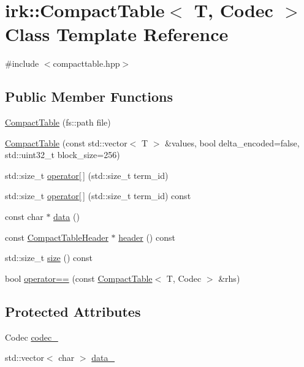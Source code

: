 \hypertarget{classirk_1_1CompactTable}{}\section{irk\+:\+:Compact\+Table$<$ T, Codec $>$ Class Template Reference}
\label{classirk_1_1CompactTable}


{\ttfamily \#include $<$compacttable.\+hpp$>$}

\subsection*{Public Member Functions}
\begin{DoxyCompactItemize}
\item 
\mbox{\hyperlink{classirk_1_1CompactTable_ae43cef6f30a5f83f0fbdbfec98adcc31}{Compact\+Table}} (fs\+::path file)
\item 
\mbox{\hyperlink{classirk_1_1CompactTable_a8dad958871c16f0d615d6dafcbcc2284}{Compact\+Table}} (const std\+::vector$<$ T $>$ \&values, bool delta\+\_\+encoded=false, std\+::uint32\+\_\+t block\+\_\+size=256)
\item 
std\+::size\+\_\+t \mbox{\hyperlink{classirk_1_1CompactTable_ac38c5d57aa8e8f26f844952d0ac3b392}{operator\mbox{[}$\,$\mbox{]}}} (std\+::size\+\_\+t term\+\_\+id)
\item 
std\+::size\+\_\+t \mbox{\hyperlink{classirk_1_1CompactTable_afc3597fe319993be64bdaabc53863c9b}{operator\mbox{[}$\,$\mbox{]}}} (std\+::size\+\_\+t term\+\_\+id) const
\item 
const char $\ast$ \mbox{\hyperlink{classirk_1_1CompactTable_a03d76b3db79f79d4c218e1eeeb9cad42}{data}} ()
\item 
const \mbox{\hyperlink{structirk_1_1CompactTableHeader}{Compact\+Table\+Header}} $\ast$ \mbox{\hyperlink{classirk_1_1CompactTable_aaf2fb5e1a0fd2e168dced03b4ebbf1a7}{header}} () const
\item 
std\+::size\+\_\+t \mbox{\hyperlink{classirk_1_1CompactTable_a9db06db7cac84c926e5cbb5337bef866}{size}} () const
\item 
bool \mbox{\hyperlink{classirk_1_1CompactTable_a9d24f06e148daecc62d8c28f99c83b17}{operator==}} (const \mbox{\hyperlink{classirk_1_1CompactTable}{Compact\+Table}}$<$ T, Codec $>$ \&rhs)
\end{DoxyCompactItemize}
\subsection*{Protected Attributes}
\begin{DoxyCompactItemize}
\item 
Codec \mbox{\hyperlink{classirk_1_1CompactTable_a05373e28140104bc8242b8d053a55ce7}{codec\+\_\+}}
\item 
std\+::vector$<$ char $>$ \mbox{\hyperlink{classirk_1_1CompactTable_acaf68f9dded9dc9357bd349387fdda5c}{data\+\_\+}}
\end{DoxyCompactItemize}
